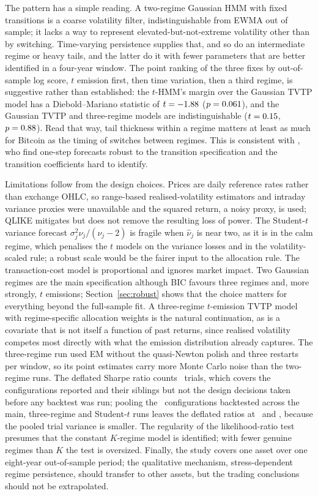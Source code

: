 \documentclass[11pt,a4paper]{article}
\begin{document}
The pattern has a simple reading. A two-regime Gaussian HMM with fixed transitions is a coarse volatility filter, indistinguishable from EWMA out of sample; it lacks a way to represent elevated-but-not-extreme volatility other than by switching. Time-varying persistence supplies that, and so do an intermediate regime or heavy tails, and the latter do it with fewer parameters that are better identified in a four-year window. The point ranking of the three fixes by out-of-sample log score, $t$ emission first, then time variation, then a third regime, is suggestive rather than established: the $t$-HMM's margin over the Gaussian TVTP model has a Diebold--Mariano statistic of $t=-1.88$ ($p=0.061$), and the Gaussian TVTP and three-regime models are indistinguishable ($t=0.15$, $p=0.88$). Read that way, tail thickness within a regime matters at least as much for Bitcoin as the timing of switches between regimes. This is consistent with \citet{modee2026}, who find one-step forecasts robust to the transition specification and the transition coefficients hard to identify.

Limitations follow from the design choices. Prices are daily reference rates rather than exchange OHLC, so range-based realised-volatility estimators and intraday variance proxies were unavailable and the squared return, a noisy proxy, is used; QLIKE mitigates but does not remove the resulting loss of power. The Student-$t$ variance forecast $\sigma_j^2\nu_j/(\nu_j-2)$ is fragile when $\hat\nu_j$ is near two, as it is in the calm regime, which penalises the $t$ models on the variance losses and in the volatility-scaled rule; a robust scale would be the fairer input to the allocation rule. The transaction-cost model is proportional and ignores market impact. Two Gaussian regimes are the main specification although BIC favours three regimes and, more strongly, $t$ emissions; Section~\ref{sec:robust} shows that the choice matters for everything beyond the full-sample fit. A three-regime $t$-emission TVTP model with regime-specific allocation weights is the natural continuation, as is a covariate that is not itself a function of past returns, since realised volatility competes most directly with what the emission distribution already captures. The three-regime run used EM without the quasi-Newton polish and three restarts per window, so its point estimates carry more Monte Carlo noise than the two-regime runs. The deflated Sharpe ratio counts \NTrials\ trials, which covers the configurations reported and their siblings but not the design decisions taken before any backtest was run; pooling the \NTrialsAll\ configurations backtested across the main, three-regime and Student-$t$ runs leaves the deflated ratios at \DSRpooled\ and \DSRKpooled, because the pooled trial variance is smaller. The regularity of the likelihood-ratio test presumes that the constant $K$-regime model is identified; with fewer genuine regimes than $K$ the test is oversized. Finally, the study covers one asset over one eight-year out-of-sample period; the qualitative mechanism, stress-dependent regime persistence, should transfer to other assets, but the trading conclusions should not be extrapolated.
\end{document}
